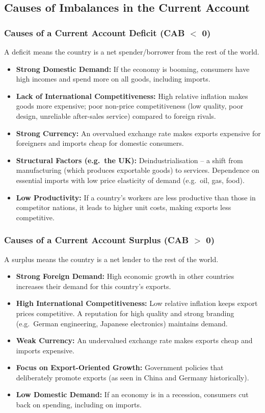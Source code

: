\documentclass[11pt, a4paper, twoside]{book}
\begin{document}
\subsection{Causes of Imbalances in the Current Account}

\subsubsection{Causes of a Current Account Deficit (CAB $<$ 0)}

A deficit means the country is a net spender/borrower from the rest of the world.

\begin{itemize}
  \item \textbf{Strong Domestic Demand:} If the economy is booming, consumers have high incomes and spend more on all goods, including imports.
  \item \textbf{Lack of International Competitiveness:} High relative inflation makes goods more expensive; poor non-price competitiveness (low quality, poor design, unreliable after-sales service) compared to foreign rivals.
  \item \textbf{Strong Currency:} An overvalued exchange rate makes exports expensive for foreigners and imports cheap for domestic consumers.
  \item \textbf{Structural Factors (e.g.\ the UK):} Deindustrialisation -- a shift from manufacturing (which produces exportable goods) to services. Dependence on essential imports with low price elasticity of demand (e.g.\ oil, gas, food).
  \item \textbf{Low Productivity:} If a country's workers are less productive than those in competitor nations, it leads to higher unit costs, making exports less competitive.
\end{itemize}

\subsubsection{Causes of a Current Account Surplus (CAB $>$ 0)}

A surplus means the country is a net lender to the rest of the world.

\begin{itemize}
  \item \textbf{Strong Foreign Demand:} High economic growth in other countries increases their demand for this country's exports.
  \item \textbf{High International Competitiveness:} Low relative inflation keeps export prices competitive. A reputation for high quality and strong branding (e.g.\ German engineering, Japanese electronics) maintains demand.
  \item \textbf{Weak Currency:} An undervalued exchange rate makes exports cheap and imports expensive.
  \item \textbf{Focus on Export-Oriented Growth:} Government policies that deliberately promote exports (as seen in China and Germany historically).
  \item \textbf{Low Domestic Demand:} If an economy is in a recession, consumers cut back on spending, including on imports.
\end{itemize}
\end{document}
